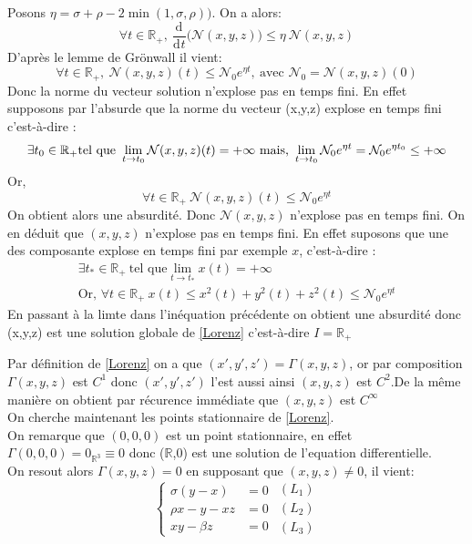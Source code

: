 \documentclass{article}
\newcommand{\R}{\mathbb{R}}
\newcommand{\deriv}[3][ ]{
    \ensuremath{\frac{\mathrm{d}^{#1}#2}{\mathrm{d}^{#1} #3}}
}
\newcommand{\cad}{c'est-\`a-dire }
\begin{document}
Posons $ \eta = \sigma + \rho - 2 \min (1,\sigma,\rho))$. On a alors: 
\[
    \forall t \in \R_+, \: \deriv{}{t}\bigg( \mathcal{N}(x,y,z)\bigg) \le \eta\: \mathcal{N}(x,y,z)
\]
D'après le lemme de Grönwall il vient:
\[
    \forall t \in \R_+,\: \mathcal{N}(x,y,z)(t) \le \mathcal{N}_0 e^{\eta t},\: \textrm{avec } \mathcal{N}_0 = \mathcal{N}(x,y,z)(0)
\]
Donc la norme du vecteur solution n'explose pas en temps fini. En effet supposons par l'absurde que la norme du vecteur (x,y,z) explose en temps fini \cad: 
\[
\exists t_0 \in \R_+ \textrm{tel que } \lim_{t \to t_0} \mathcal{N}(x,y,z)(t)=+\infty \  \textrm{mais, } \\
\lim_{t\to t_0} \mathcal{N}_0 e^{\eta t} = \mathcal{N}_0 e^{\eta t_0} \le + \infty
\]
Or,
\[\forall t \in \R_+ \: \mathcal{N}(x,y,z)(t) \le \mathcal{N}_0 e^{\eta t}
\]On obtient alors une absurdité. Donc $\mathcal{N}(x,y,z)$ n'explose pas en temps fini. On en déduit que $(x,y,z)$ n'explose pas en temps fini. En effet suposons que une des composante explose en temps fini par exemple $x$, \cad:
\begin{gather*}
    \exists t_* \in \R_+ \: \textrm{tel que} \lim_{t \to t_*} x(t) = + \infty\\
    \textrm{Or, } \forall t \in \R_+ \: x(t) \le x^2(t) + y^2(t) + z^2(t) \le \mathcal{N}_0 e^{\eta t}
\end{gather*}
En passant \`a la limte dans l'inéquation précédente on obtient une absurdité donc (x,y,z) est une solution globale de \eqref{Lorenz} \cad $I=\R_+$

Par définition de \eqref{Lorenz} on a que $(x',y',z') = \Gamma(x,y,z)$, or par composition $\Gamma(x,y,z)$ est $C^1$ donc $(x',y',z')$ l'est aussi ainsi $(x,y,z)$ est $C^2$.De la même manière on obtient par récurence immédiate que $(x,y,z)$ est $C^\infty$\\
On cherche maintenant les points stationnaire de \eqref{Lorenz}.\\
On remarque que $(0,0,0)$ est un point stationnaire, en effet $\Gamma(0,0,0) = 0_{\R^3} \equiv 0$ donc ($\R$,0) est une solution de l'equation differentielle.\\
On resout alors $\Gamma(x,y,z)=0$ en supposant que $(x,y,z) \neq 0$, il vient:
\[
\left\{\begin{array}{rl}
     \sigma(y-x)&=0  \\
     \rho x -y -xz&=0\\
     xy - \beta z&=0
\end{array}\right.
\begin{array}{c}
    (L_1)\\
    (L_2)\\
    (L_3)
\end{array}
\]
\end{document}
